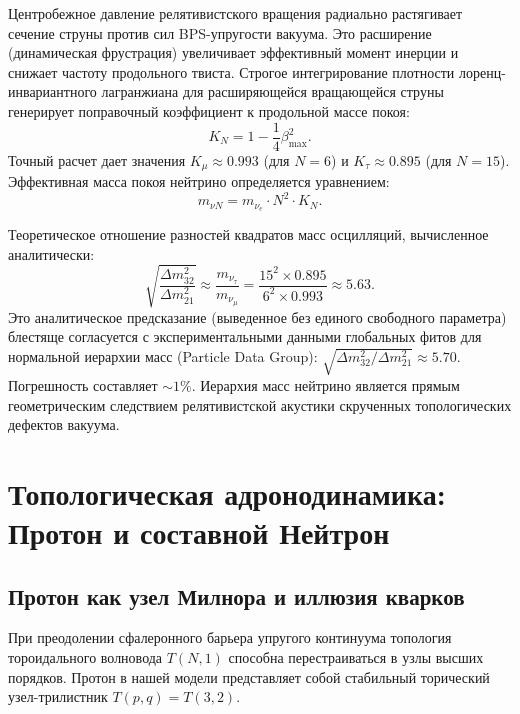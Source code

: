 \documentclass[12pt,a4paper]{article}
\begin{document}
Центробежное давление релятивистского вращения радиально растягивает сечение струны против сил BPS-упругости вакуума. Это расширение (динамическая фрустрация) увеличивает эффективный момент инерции и снижает частоту продольного твиста. Строгое интегрирование плотности лоренц-инвариантного лагранжиана для расширяющейся вращающейся струны генерирует поправочный коэффициент к продольной массе покоя:
\begin{equation}
	K_N = 1 - \frac{1}{4} \beta_{\text{max}}^2.
\end{equation}
Точный расчет дает значения $K_\mu \approx 0.993$ (для $N=6$) и $K_\tau \approx 0.895$ (для $N=15$). Эффективная масса покоя нейтрино определяется уравнением:
\begin{equation}
	m_{\nu N} = m_{\nu_e} \cdot N^2 \cdot K_N.
\end{equation}

Теоретическое отношение разностей квадратов масс осцилляций, вычисленное аналитически:
\begin{equation}
	\sqrt{\frac{\Delta m^2_{32}}{\Delta m^2_{21}}} \approx \frac{m_{\nu_\tau}}{m_{\nu_\mu}} = \frac{15^2 \times 0.895}{6^2 \times 0.993} \approx 5.63.
\end{equation}
Это аналитическое предсказание (выведенное без единого свободного параметра) блестяще согласуется с экспериментальными данными глобальных фитов для нормальной иерархии масс (Particle Data Group): $\sqrt{\Delta m^2_{32} / \Delta m^2_{21}} \approx 5.70$. Погрешность составляет $\sim 1\%$. 
Иерархия масс нейтрино является прямым геометрическим следствием релятивистской акустики скрученных топологических дефектов вакуума.

\section{Топологическая адронодинамика: Протон и составной Нейтрон}

\subsection{Протон как узел Милнора и иллюзия кварков}
При преодолении сфалеронного барьера упругого континуума топология тороидального волновода $T(N,1)$ способна перестраиваться в узлы высших порядков. Протон в нашей модели представляет собой стабильный торический узел-трилистник $T(p,q) = T(3,2)$. 
\end{document}
